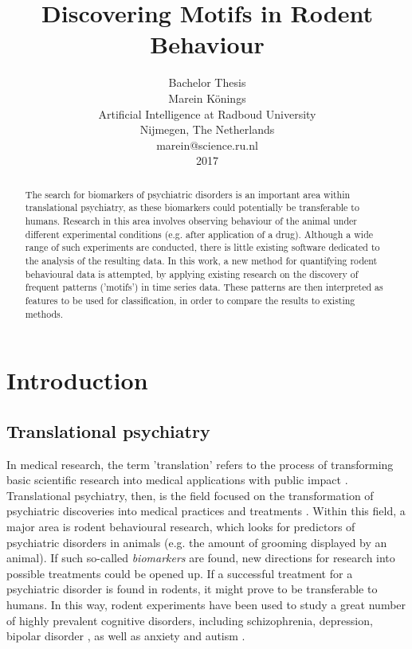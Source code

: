 \documentclass[conference,a4paper,twoside]{IEEEtran}
\begin{document}
\title{Discovering Motifs in Rodent Behaviour}

\author{
    Bachelor Thesis \\
    Marein Könings \\
    Artificial Intelligence at Radboud University \\
    Nijmegen, The Netherlands \\
    marein@science.ru.nl \\
    2017 \\
}

\maketitle
\thispagestyle{plain}
\pagestyle{plain}

\begin{abstract}
        The search for biomarkers of psychiatric disorders is an important area within translational psychiatry, as these biomarkers could potentially be transferable to humans. Research in this area involves observing behaviour of the animal under different experimental conditions (e.g. after application of a drug). Although a wide range of such experiments are conducted, there is little existing software dedicated to the analysis of the resulting data. In this work, a new method for quantifying rodent behavioural data is attempted, by applying existing research on the discovery of frequent patterns ('motifs') in time series data. These patterns are then interpreted as features to be used for classification, in order to compare the results to existing methods.
\end{abstract}

\section{Introduction}
\label{sec:intro}

\subsection{Translational psychiatry}
\label{sec:intro_transpsych}
In medical research, the term 'translation' refers to the process of transforming basic scientific research into medical applications with public impact \cite{drolet2011translational} \cite{woolf2008meaning}. Translational psychiatry, then, is the field focused on the transformation of psychiatric discoveries into medical practices and treatments \cite{machado2012tracking}. Within this field, a major area is rodent behavioural research, which looks for predictors of psychiatric disorders in animals (e.g. the amount of grooming displayed by an animal). If such so-called \emph{biomarkers} are found, new directions for research into possible treatments could be opened up. If a successful treatment for a psychiatric disorder is found in rodents, it might prove to be transferable to humans. In this way, rodent experiments have been used to study a great number of highly prevalent cognitive disorders, including schizophrenia, depression, bipolar disorder \cite{nestler2010animal}, as well as anxiety and autism \cite{stewart2015developing}.
\end{document}
